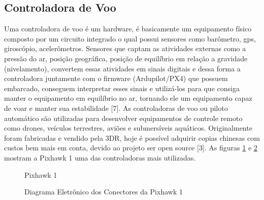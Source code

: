 \subsection{Controladora de Voo}
Uma controladora de voo é um hardware, é basicamente um equipamento físico composto por um circuito integrado o qual possui sensores como barômetro, gps, giroscópio, acelerômetros. Sensores que captam as atividades externas como a pressão do ar, posição geográfica, posição de equilíbrio em relação a gravidade (nivelamento), convertem essas atividades em sinais digitais e dessa forma a controladora juntamente com o firmware (Ardupilot/PX4) que possuem embarcado, conseguem interpretar esses sinais e utilizá-los para que consiga manter o equipamento em equilíbrio no ar, tornando ele um equipamento capaz de voar   e manter sua estabilidade \cite{sete}[7].     
As controladoras de voo ou piloto automático são utilizadas para desenvolver equipamentos de controle remoto como drones, veículos terrestres, aviões e submersíveis aquáticos. Originalmente foram fabricadas e vendido pela 3DR, hoje é possível adquirir copias chinesas com custos bem mais em conta, devido ao projeto ser open source [3].
As figuras \ref{fig:pixhawk} e \ref{fig:pixhawkCirc} mostram a Pixhawk 1 uma das controladoras mais utilizadas.

%
\begin{figure}[H]
	\centering
	\caption{Pixhawk 1}
	\fontsize{9pt}{12pt}\selectfont
	\def\svgwidth{13cm}
	
	\label{fig:pixhawk}
\end{figure}

%
\begin{figure}[H]
	\centering
	\caption{Diagrama Eletrônico dos Conectores da Pixhawk 1}
	\fontsize{9pt}{12pt}\selectfont
	\def\svgwidth{13cm}
	
	\label{fig:pixhawkCirc}
\end{figure}

